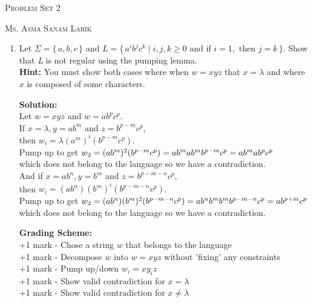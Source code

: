 \documentclass[11pt, article, oneside]{memoir}
\newcommand{\set}[1]{\{\, #1\, \}}
\begin{document}
\begin{center}
\LARGE{\textsc{Problem Set 2}}
 
\large{\textsc{Ms. Asma Sanam Larik}}
\end{center}

\begin{enumerate}
    \item
        Let \(\Sigma = \set{a, b, c}\) and \(L = \set{ {a^i}{b^j}{c^k} \mid i, j, k \ge 0 \text{ and if } i = 1,  \text{ then } j = k}\). Show that \textit{L} is not regular using the pumping lemma.
        \\\textbf{Hint:} You must show both cases where when \(w = xyz\) that \(x = \lambda\) and where \(x\) is composed of some characters.

        \textbf{Solution:}
        \\Let \(w = xyz\) and \(w = ab^pc^p\).
        \\If \(x = \lambda, y = ab^m\) and \(z = b^{p - m}c^p\),
        \\then \(w_i = \lambda(a^m)^i(b^{p - m}c^p)\).
        \\Pump up to get \(w_2 = (ab^m)^2(b^{p - m}c^p)
        \\= ab^mab^mb^{p - m}c^p
        \\= ab^mab^pc^p\)
        \\which does not belong to the language so we have a contradiction.
        \\And if \(x = ab^n, y = b^m\) and \(z = b^{p - m - n}c^p\),
        \\then \(w_i = (ab^n)(b^m)^i(b^{p - m - n}c^p)\).
        \\Pump up to get \(w_2 = (ab^n)(b^m)^2(b^{p - m - n}c^p)
        \\= ab^nb^mb^mb^{p - m - n}c^p
        \\= ab^{p + m}c^p\)
        \\which does not belong to the language so we have a contradiction.

        \textbf{Grading Scheme:}
        \\+1 mark - Chose a string \(w\) that belongs to the language
        \\+1 mark - Decompose \(w\) into \(w = xyz\) without 'fixing' any constraints
        \\+1 mark - Pump up/down \(w_i = xy_iz\)
        \\+1 mark - Show valid contradiction for \(x = \lambda\)
        \\+1 mark - Show valid contradiction for \(x \neq \lambda\)
        

\end{enumerate}
\end{document}
